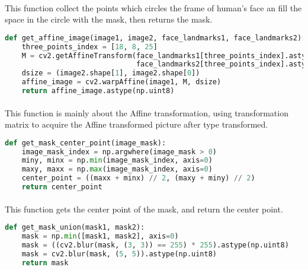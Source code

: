 \documentclass{article}
\begin{document}
		\paragraph{}This function collect the points which circles the frame of human's face an fill the space in the circle with the mask, then returns the mask. 
		\begin{lstlisting}[language=Python]
def get_affine_image(image1, image2, face_landmarks1, face_landmarks2):
    three_points_index = [18, 8, 25]
    M = cv2.getAffineTransform(face_landmarks1[three_points_index].astype(np.float32),
                               face_landmarks2[three_points_index].astype(np.float32))
    dsize = (image2.shape[1], image2.shape[0])
    affine_image = cv2.warpAffine(image1, M, dsize)
    return affine_image.astype(np.uint8)
		\end{lstlisting}
		\paragraph{}This function is mainly about the Affine transformation, using transformation matrix to acquire the Affine transformed picture after type transformed. 
		\begin{lstlisting}[language=Python]
def get_mask_center_point(image_mask):
    image_mask_index = np.argwhere(image_mask > 0)
    miny, minx = np.min(image_mask_index, axis=0)
    maxy, maxx = np.max(image_mask_index, axis=0)
    center_point = ((maxx + minx) // 2, (maxy + miny) // 2)
    return center_point
		\end{lstlisting}
		\paragraph{}This function gets the center point of the mask, and return the center point. 
		\begin{lstlisting}[language=Python]
def get_mask_union(mask1, mask2):
    mask = np.min([mask1, mask2], axis=0)
    mask = ((cv2.blur(mask, (3, 3)) == 255) * 255).astype(np.uint8)  
    mask = cv2.blur(mask, (5, 5)).astype(np.uint8) 
    return mask
		\end{lstlisting}
\end{document}
